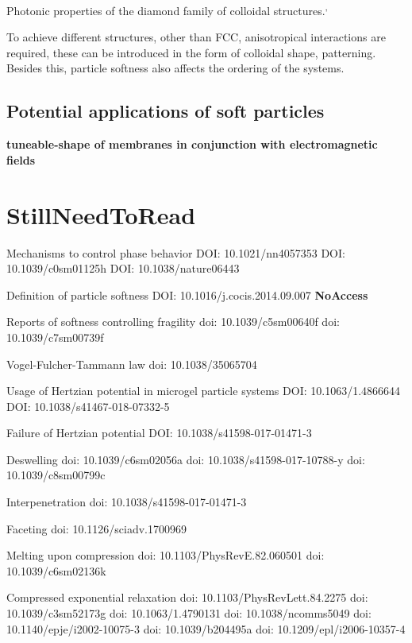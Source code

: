 \documentclass[11pt]{article}
\begin{document}
Photonic properties of the diamond family of colloidal structures.\autocite{Kleinert.2010}\textsuperscript{,}\autocite{Vlasov.2001}

To achieve different structures, other than FCC, anisotropical interactions are required, these can be introduced in the form of colloidal shape, patterning.\autocite{Marson.2019} Besides this, particle softness also affects the ordering of the systems.\autocite{Gnan.2019}

\subsection{Potential applications of soft particles}

\textbf{tuneable-shape of membranes in conjunction with electromagnetic fields}


 












\section{StillNeedToRead}

Mechanisms to control phase behavior
DOI: 10.1021/nn4057353 
DOI: 10.1039/c0sm01125h 
DOI: 10.1038/nature06443

Definition of particle softness
DOI: 10.1016/j.cocis.2014.09.007  \textbf{NoAccess}

Reports of softness controlling fragility
doi: 10.1039/c5sm00640f 
doi: 10.1039/c7sm00739f

Vogel-Fulcher-Tammann law
doi: 10.1038/35065704 

Usage of Hertzian potential in microgel particle systems
 DOI: 10.1063/1.4866644 
 DOI: 10.1038/s41467-018-07332-5 
 
Failure of Hertzian potential
 DOI: 10.1038/s41598-017-01471-3 
 
Deswelling
doi: 10.1039/c6sm02056a
doi: 10.1038/s41598-017-10788-y
doi: 10.1039/c8sm00799c


Interpenetration
doi: 10.1038/s41598-017-01471-3

Faceting
doi: 10.1126/sciadv.1700969

Melting upon compression
doi: 10.1103/PhysRevE.82.060501
doi: 10.1039/c6sm02136k

Compressed exponential relaxation
doi: 10.1103/PhysRevLett.84.2275
doi: 10.1039/c3sm52173g
doi: 10.1063/1.4790131
doi: 10.1038/ncomms5049
doi: 10.1140/epje/i2002-10075-3
doi: 10.1039/b204495a
doi: 10.1209/epl/i2006-10357-4
\end{document}
